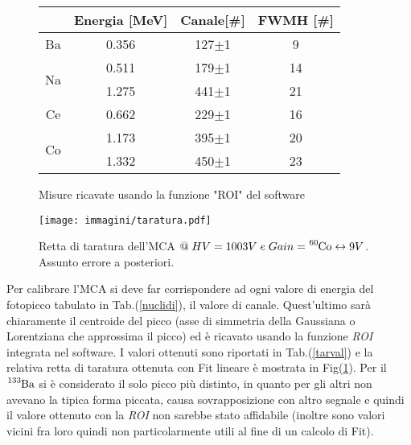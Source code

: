 \documentclass[12pt,a4paper,openright,twoside]{article}
\numberwithin{equation}{section} %
\begin{document}
\begin{figure}[htbp]
\hspace{-10mm}%
\begin{minipage}[c]{.45\textwidth}
\centering
\begin{tabular}{|c|c|c|c|}
\hline
                    & Energia {[}MeV{]} & Canale{[}\#{]} & FWMH {[}\#{]}\\ \hline
Ba                  & 0.356             &      127$\pm$1 & 9\\ \hline
\multirow{2}{*}{Na} & 0.511             &     179$\pm$1 & 14\\ \cline{2-4}
                    & 1.275             &     441$\pm$1 & 21\\ \hline
Ce                  & 0.662             &   229$\pm$1  & 16 \\ \hline
\multirow{2}{*}{Co} & 1.173             &   395$\pm$1   & 20\\ \cline{2-4} 
                    & 1.332             &     450$\pm$1  & 23 \\ \hline
\end{tabular}
\caption{Misure ricavate usando la funzione "ROI" del software }
\label{tarval}
\end{minipage}%
\hspace{13mm}%
\begin{minipage}[c]{0.45\textwidth}
\texttt{[image: immagini/taratura.pdf]}
\caption{Retta di taratura dell'MCA $ \mathbf{@} \; HV=1003V\; e \; Gain=\ce{^{60}_{}Co} \leftrightarrow 9V$. Assunto errore a posteriori.} 
\label{tarret}
\end{minipage}
\end{figure}

Per calibrare l'MCA si deve far corrispondere ad ogni valore di energia del fotopicco tabulato in Tab.(\ref{nuclidi}), il valore di canale. Quest'ultimo sarà chiaramente il centroide del picco (asse di simmetria della Gaussiana o Lorentziana che approssima il picco) ed è ricavato usando la funzione \textit{ROI} integrata nel software. I valori ottenuti sono riportati in Tab.(\ref{tarval}) e la relativa retta di taratura ottenuta con Fit lineare è mostrata in Fig(\ref{tarret}). Per il $\ce{^{133}_{}Ba}$ si è considerato il solo picco più distinto, in quanto per gli altri non avevano la tipica forma piccata, causa sovrapposizione con altro segnale e quindi il valore ottenuto con la \textit{ROI} non sarebbe stato affidabile (inoltre sono valori vicini fra loro quindi non particolarmente utili al fine di un calcolo di Fit).
\end{document}

